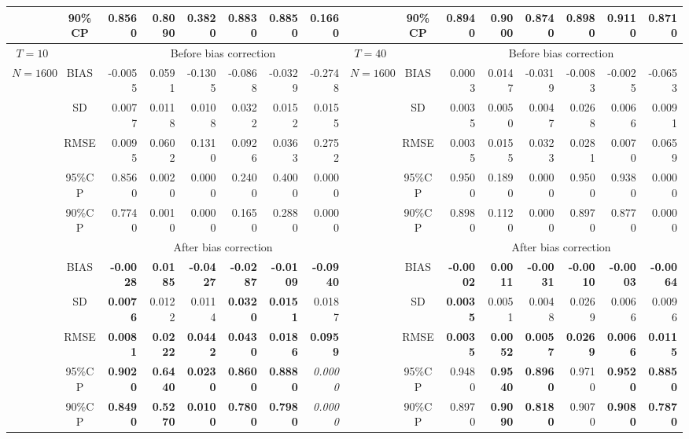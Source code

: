 \documentclass[11pt,a4paper]{article}
\begin{document}
\begin{landscape}
\begin{table}[p]
\begin{threeparttable}
{{\begin{tabular}{ccrrrrrrccrrrrrr}
 & 90\%CP & \textbf{0.8560} & \textbf{0.8090} & \textbf{0.3820} & \textbf{0.8830} & \textbf{0.8850} & \textbf{0.1660} &  & 90\%CP & 0.8940 & \textbf{0.9000} & \textbf{0.8740} & \textbf{0.8980} & \textbf{0.9110} & \textbf{0.8710} \\ \hline
$T=10$ &  & \multicolumn{6}{c}{Before bias correction} & $T=40$ &  & \multicolumn{6}{c}{Before bias correction} \\ \cline{3-8} \cline{11-16} 
$N=1600$ & BIAS & -0.0055 & 0.0591 & -0.1305 & -0.0868 & -0.0329 & -0.2748 & $N=1600$ & BIAS & 0.0003 & 0.0147 & -0.0319 & -0.0083 & -0.0025 & -0.0653 \\
 & SD & 0.0077 & 0.0118 & 0.0108 & 0.0322 & 0.0152 & 0.0155 &  & SD & 0.0035 & 0.0050 & 0.0047 & 0.0268 & 0.0066 & 0.0091 \\
 & RMSE & 0.0095 & 0.0602 & 0.1310 & 0.0926 & 0.0363 & 0.2752 &  & RMSE & 0.0035 & 0.0155 & 0.0323 & 0.0281 & 0.0070 & 0.0659 \\
 & 95\%CP & 0.8560 & 0.0020 & 0.0000 & 0.2400 & 0.4000 & 0.0000 &  & 95\%CP & 0.9500 & 0.1890 & 0.0000 & 0.9500 & 0.9380 & 0.0000 \\
 & 90\%CP & 0.7740 & 0.0010 & 0.0000 & 0.1650 & 0.2880 & 0.0000 &  & 90\%CP & 0.8980 & 0.1120 & 0.0000 & 0.8970 & 0.8770 & 0.0000 \\ \cline{2-8} \cline{10-16} 
 &  & \multicolumn{6}{c}{After bias correction} &  &  & \multicolumn{6}{c}{After bias correction} \\ \cline{3-8} \cline{11-16} 
 & BIAS & \textbf{-0.0028} & \textbf{0.0185} & \textbf{-0.0427} & \textbf{-0.0287} & \textbf{-0.0109} & \textbf{-0.0940} &  & BIAS & \textbf{-0.0002} & \textbf{0.0011} & \textbf{-0.0031} & \textbf{-0.0010} & \textbf{-0.0003} & \textbf{-0.0064} \\
 & SD & \textbf{0.0076} & 0.0122 & 0.0114 & \textbf{0.0320} & \textbf{0.0151} & 0.0187 &  & SD & \textbf{0.0035} & 0.0051 & 0.0048 & 0.0269 & 0.0066 & 0.0096 \\
 & RMSE & \textbf{0.0081} & \textbf{0.0222} & \textbf{0.0442} & \textbf{0.0430} & \textbf{0.0186} & \textbf{0.0959} &  & RMSE & \textbf{0.0035} & \textbf{0.0052} & \textbf{0.0057} & \textbf{0.0269} & \textbf{0.0066} & \textbf{0.0115} \\
 & 95\%CP & \textbf{0.9020} & \textbf{0.6440} & \textbf{0.0230} & \textbf{0.8600} & \textbf{0.8880} & \textit{0.0000} &  & 95\%CP & 0.9480 & \textbf{0.9540} & \textbf{0.8960} & 0.9710 & \textbf{0.9520} & \textbf{0.8850} \\
 & 90\%CP & \textbf{0.8490} & \textbf{0.5270} & \textbf{0.0100} & \textbf{0.7800} & \textbf{0.7980} & \textit{0.0000} &  & 90\%CP & 0.8970 & \textbf{0.9090} & \textbf{0.8180} & 0.9070 & \textbf{0.9080} & \textbf{0.7870} \\ \hline

\end{tabular}}}
\end{threeparttable}
\end{table}
\end{landscape}
\end{document}
